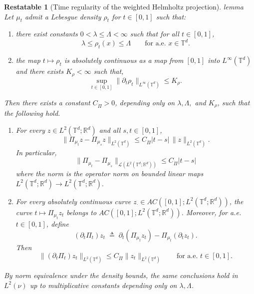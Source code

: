 \documentclass[10pt,a4paper]{amsart}
\newtheorem{restatable}{Restatable}
\begin{document}
\begin{restatable}[Time regularity of the weighted Helmholtz projection]{lemma}{}
\label{lem:time_reg_weighted_projection}
Let $\mu_t$ admit a Lebesgue density $\rho_t$ for $t \in [0, 1]$ such that:
\begin{enumerate}
    \item there exist constants
    $0<\lambda\le \Lambda<\infty$ such that for all $t\in[0,1]$,
    \[
    \lambda \le \rho_t(x)\le \Lambda
    \qquad\text{for a.e. }x\in\mathbb{T}^d.
    \]
    \item the map $t \mapsto \rho_t$ is absolutely continuous as a map from $[0,1]$ into $L^\infty(\mathbb{T}^d)$ and there exists
    $K_\rho<\infty$ such that,
    \[
    \sup_{t\in[0,1]}\|\partial_t \rho_t\|_{L^\infty(\mathbb{T}^d)}\le K_\rho.
    \]
\end{enumerate}
Then there exists a constant $C_{\dot \Pi}>0$, depending only on
$\lambda,\Lambda,$ and $K_\rho$, such that the following hold.
\begin{enumerate}
    \item For every $z\in L^2(\mathbb{T}^d;\mathbb R^d)$ and all
    $s,t\in[0,1]$,
    \[
    \|\Pi_{\mu_t}z-\Pi_{\mu_s}z\|_{L^2(\mathbb{T}^d)}
    \le
    C_{\dot\Pi}|t-s|\,\|z\|_{L^2(\mathbb{T}^d)}.
    \]
    In particular,
    \[
    \|\Pi_{\mu_t}-\Pi_{\mu_s}\|_{\mathcal L(L^2(\mathbb{T}^d;\mathbb R^d))}
    \le
    C_{\dot\Pi}|t-s|
    \]
    where the norm is the \textit{operator} norm on bounded linear maps $L^2(\mathbb{T}^d; \mathbb{R}^d) \rightarrow L^2(\mathbb{T}^d; \mathbb{R}^d).$
    \item For every absolutely continuous curve
    $z_\cdot \in AC([0,1];L^2(\mathbb{T}^d;\mathbb R^d))$, the curve
    $t\mapsto \Pi_{\mu_t}z_t$ belongs to
    $AC([0,1];L^2(\mathbb{T}^d;\mathbb R^d))$.
    Moreover, for a.e. $t\in[0,1]$, define
    \[
    (\partial_t\Pi_t)z_t
    \;\triangleq\;
    \partial_t(\Pi_{\mu_t}z_t)-\Pi_{\mu_t}(\partial_t z_t).
    \]
    Then
    \[
    \|(\partial_t\Pi_t)z_t\|_{L^2(\mathbb{T}^d)}
    \le
    C_{\dot\Pi}\|z_t\|_{L^2(\mathbb{T}^d)}
    \qquad\text{for a.e. }t\in[0,1].
    \]
\end{enumerate}
By norm equivalence under the density bounds, the same conclusions hold in
$L^2(\nu)$ up to multiplicative constants depending only on $\lambda,\Lambda$.
\end{restatable}
\end{document}
